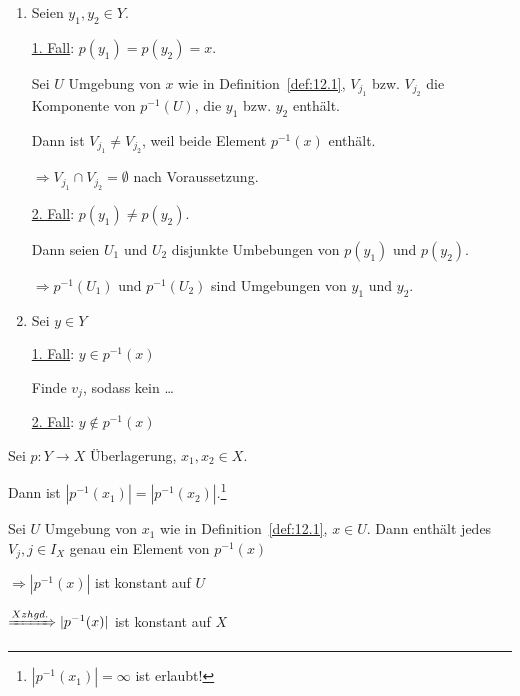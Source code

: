 \begin{beweis}
    \begin{enumerate}[label=\alph*)]
        \item Seien $y_1, y_2 \in Y$.

        \underline{1. Fall}: $p(y_1) = p(y_2) = x$.

        Sei $U$ Umgebung von $x$ wie in Definition~\ref{def:12.1},
        $V_{j_1}$ bzw. $V_{j_2}$ die Komponente von $p^{-1}(U)$, die
        $y_1$ bzw. $y_2$ enthält.

        Dann ist $V_{j_1} \neq V_{j_2}$, weil beide  Element $p^{-1}(x)$
        enthält.

        $\Rightarrow V_{j_1} \cap V_{j_2} = \emptyset$ nach Voraussetzung.

        \underline{2. Fall}: $p(y_1) \neq p(y_2)$.
        
        Dann seien $U_1$ und $U_2$ disjunkte Umbebungen von $p(y_1)$
        und $p(y_2)$.

        $\Rightarrow p^{-1}(U_1)$ und $p^{-1}(U_2)$ sind Umgebungen von
        $y_1$ und $y_2$.

        \item Sei $y \in Y$

        \underline{1. Fall}: $y \in p^{-1}(x)$

        Finde $v_j$, sodass kein \dots {}

        \underline{2. Fall}: $y \notin p^{-1}(x)$

    \end{enumerate}
\end{beweis}

\begin{korollar}%
    Sei $p: Y \rightarrow X$ Überlagerung, $x_1, x_2 \in X$.

    Dann ist $|p^{-1} (x_1)| = |p^{-1}(x_2)|$.\footnote{$|p^{-1} (x_1)| = \infty$ ist erlaubt!}
\end{korollar}

\begin{beweis}
    Sei $U$ Umgebung von $x_1$ wie in Definition~\ref{def:12.1}, $x \in U$.
    Dann enthält jedes $V_j, j \in I_X$ genau ein Element von
    $p^{-1}(x)$

    $\Rightarrow |p^{-1} (x)|$ ist konstant auf $U$

    $\xRightarrow{X zhgd.} |p^{-1}(x)|$  ist konstant auf $X$
\end{beweis}

